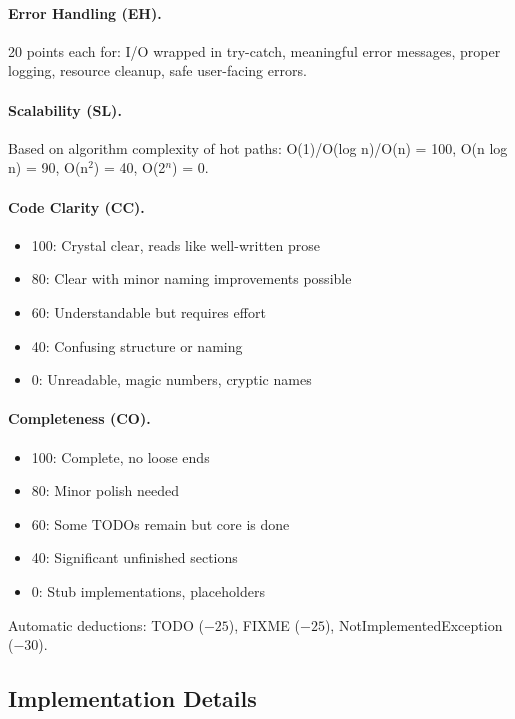 \paragraph{Error Handling (EH).}
20 points each for: I/O wrapped in try-catch, meaningful error messages,
proper logging, resource cleanup, safe user-facing errors.

\paragraph{Scalability (SL).}
Based on algorithm complexity of hot paths:
O(1)/O(log n)/O(n) = 100, O(n log n) = 90, O(n$^2$) = 40, O(2$^n$) = 0.

\paragraph{Code Clarity (CC).}
\begin{itemize}
    \item 100: Crystal clear, reads like well-written prose
    \item 80: Clear with minor naming improvements possible
    \item 60: Understandable but requires effort
    \item 40: Confusing structure or naming
    \item 0: Unreadable, magic numbers, cryptic names
\end{itemize}

\paragraph{Completeness (CO).}
\begin{itemize}
    \item 100: Complete, no loose ends
    \item 80: Minor polish needed
    \item 60: Some TODOs remain but core is done
    \item 40: Significant unfinished sections
    \item 0: Stub implementations, placeholders
\end{itemize}

Automatic deductions: TODO ($-25$), FIXME ($-25$), NotImplementedException ($-30$).

\subsection{Implementation Details}
\label{subsec:implementation-detail}

